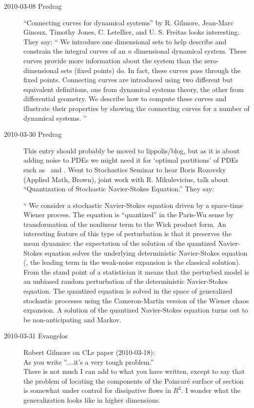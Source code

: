 \begin{description}
\item[2010-03-08 Predrag]
``Connecting curves for dynamical systems'' by
R. Gilmore, Jean-Marc Ginoux, Timothy Jones, C. Letellier, and U. S.
 Freitas looks interesting. They say:
``
 We introduce one dimensional sets to help describe and constrain the integral
curves of an $n$ dimensional dynamical system. These curves provide more
information about the system than the zero-dimensional sets (fixed points) do.
In fact, these curves pass through the fixed points. Connecting curves are
introduced using two different but equivalent definitions, one from dynamical
systems theory, the other from differential geometry. We describe how to
compute these curves and illustrate their properties by showing the connecting
curves for a number of dynamical systems.
''


\item[2010-03-30 Predrag] This entry should probably be moved
to lippolis/blog, but as it is about adding noise to PDEs we might need it for
`optimal partitions' of PDEs such as \KSe\ and \NSe.
Went to
Stochastics Seminar to hear
Boris Rozovsky (Applied Math, Brown), joint work with
R. Mikulevicius, talk about
``Quantization of Stochastic Navier-Stokes Equation.''
They say:

`` We consider a stochastic Navier-Stokes equation driven by a space-time
Wiener process. The equation is ``quantized'' in the Paris-Wu
sense by transformation of the
nonlinear term to the Wick product form. An interesting feature of
this type of perturbation is that it preserves the mean dynamics: the
expectation of the solution of the quantized Navier-Stokes equation
solves the underlying deterministic Navier-Stokes equation (\ie,
the leading term in the weak-noise expansion is the classical solution).
From the
stand point of a statistician it means that the perturbed model is
an unbiased random perturbation of the deterministic Navier-Stokes
equation. The quantized equation is solved in the space of generalized
stochastic processes using the Cameron-Martin version of the Wiener
chaos expansion. A solution of the quantized Navier-Stokes equation turns out
to be non-anticipating and Markov.

\item[2010-03-31 Evangelos] Robert Gilmore on CLe paper (2010-03-18):\\

As you write ''....it's a very tough problem.''\\

There is not much I can add to what you have written,
except to say that the problem of locating the components
of the Poincar\'e surface of section is somewhat
under control for dissipative flows in $R^3$.
I wonder what the generalization looks like in
higher dimensions.


\end{description}
